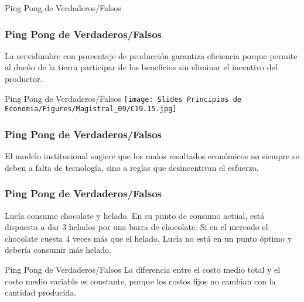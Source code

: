\documentclass{beamer}
\begin{document}
\begin{frame}{Ping Pong de Verdaderos/Falsos}
\begin{figure}[h!]
\begin{center}
        \end{center}
    \end{figure}
\end{frame}


\begin{frame}
\frametitle{Ping Pong de Verdaderos/Falsos}
    \centering

    La servidumbre con porcentaje de producción garantiza eficiencia porque permite al dueño de la tierra participar de los beneficios sin eliminar el incentivo del productor.

\end{frame}

\begin{frame}{Ping Pong de Verdaderos/Falsos}
    \centering
    \texttt{[image: Slides Principios de Economia/Figures/Magistral\_09/C19.15.jpg]}
\end{frame}

\begin{frame}
\frametitle{Ping Pong de Verdaderos/Falsos}
    \centering
    El modelo institucional sugiere que los malos resultados económicos no siempre se deben a falta de tecnología, sino a reglas que desincentivan el esfuerzo.
\end{frame}


\begin{frame}
\frametitle{Ping Pong de Verdaderos/Falsos}
\centering
Lucía consume chocolate y helado. En su punto de consumo actual, está dispuesta a dar 3 helados por una barra de chocolate. Si en el mercado el chocolate cuesta 4 veces más que el helado, Lucía no está en un punto óptimo y debería consumir más helado.
\end{frame}

\begin{frame}{Ping Pong de Verdaderos/Falsos}
    \centering
    La diferencia entre el costo medio total y el costo medio variable es constante, porque los costos fijos no cambian con la cantidad producida.
\end{frame}
\end{document}
